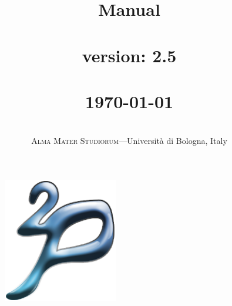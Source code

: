 \documentclass[11pt]{report}
\title{{\Huge{\bf{\tuprolog{} Manual\\\mbox{ }\\}}}
        \tuprolog{} version: 2.5\\\mbox{ }\\
{\small\today\\}
}
\author{ \mbox{ }\\ \textsc{Alma Mater Studiorum}---Universit\`{a} di Bologna, Italy
}
\date{}
\newcommand\logo{
    \begin{figure}[tp]
        \begin{center}
            \includegraphics[width=5cm]{images/logo}
        \end{center}
\end{figure}
}
\begin{document}
\logo

\maketitle

\tableofcontents












\end{document}
